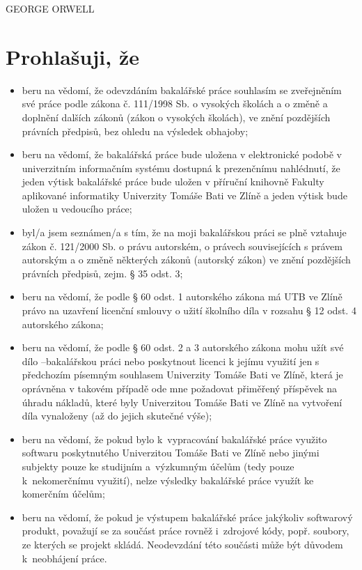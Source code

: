 \documentclass[a4paper,12pt,twoside,BCOR=10mm]{article}
\newcommand{\nmm}[1]{\section*{#1}} %
\begin{document}
\hspace{9cm}GEORGE ORWELL
\clearpage
\thispagestyle{empty}
\clearpage
\nmm{Prohlašuji, že}
\begin{itemize}\fontsize{10}{1}
\normalsize
\item beru na vědomí, že odevzdáním bakalářské práce souhlasím se zveřejněním své práce podle zákona č. 111/1998 Sb. o vysokých školách a o změně a doplnění dalších zákonů (zákon o vysokých školách), ve znění pozdějších právních předpisů, bez ohledu na výsledek obhajoby;
\item beru na vědomí, že bakalářská práce bude uložena v elektronické podobě v univerzitním informačním systému dostupná k prezenčnímu nahlédnutí, že jeden výtisk bakalářské práce bude uložen v příruční knihovně Fakulty aplikované informatiky Univerzity Tomáše Bati ve Zlíně a jeden výtisk bude uložen u vedoucího práce; 
\item byl/a jsem seznámen/a s tím, že na moji bakalářskou práci se plně vztahuje zákon č. 121/2000 Sb. o právu autorském, o právech souvisejících s právem autorským a o změně některých zákonů (autorský zákon) ve znění pozdějších právních předpisů, zejm. § 35 odst. 3;
\item beru na vědomí, že podle § 60 odst. 1 autorského zákona má UTB ve Zlíně právo na uzavření licenční smlouvy o užití školního díla v rozsahu § 12 odst. 4 autorského zákona;
\item beru na vědomí, že podle § 60 odst. 2 a 3 autorského zákona mohu užít své dílo –bakalářskou práci nebo poskytnout licenci k jejímu využití jen s předchozím písemným souhlasem Univerzity Tomáše Bati ve Zlíně, která je oprávněna v takovém případě ode mne požadovat přiměřený příspěvek na úhradu nákladů, které byly Univerzitou Tomáše Bati ve Zlíně na vytvoření díla vynaloženy (až do jejich skutečné výše);
\item beru na vědomí, že pokud bylo k~vypracování bakalářské práce využito softwaru poskytnutého Univerzitou Tomáše Bati ve Zlíně nebo jinými subjekty pouze ke studijním a~výzkumným účelům (tedy pouze k~nekomerčnímu využití), nelze výsledky bakalářské práce využít ke komerčním účelům;
\item beru na vědomí, že pokud je výstupem bakalářské práce jakýkoliv softwarový produkt, považují se za součást práce rovněž i~zdrojové kódy, popř. soubory, ze kterých se projekt skládá. Neodevzdání této součásti může být důvodem k~neobhájení práce.
\end{itemize}
\end{document}
